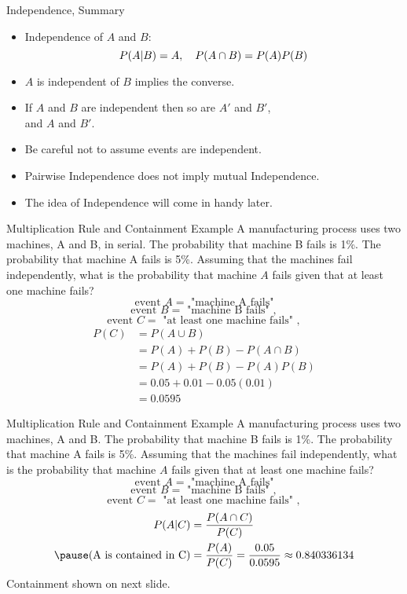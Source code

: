 \documentclass[handout]{beamer}
\begin{document}
\begin{frame}{Independence, Summary}
    \begin{itemize}
        \item Independence of $A$ and $B$:
        $$P(A|B) = A, \hskip 1em P(A \cap B) = P(A)P(B)$$
        \item $A$ is independent of $B$ implies the converse.
        \item If $A$ and $B$ are independent then so are $A'$ and $B'$,\\ and $A$ and $B'$.
        \item Be careful not to assume events are independent.
        \item Pairwise Independence does not imply mutual Independence.
        \item The idea of Independence will come in handy later.
    \end{itemize}
\end{frame}

\begin{frame}{Multiplication Rule and Containment Example}
    A manufacturing process uses two machines, A and B, in serial. The probability that machine B fails is 1\%. The probability that machine A fails is 5\%. Assuming that the machines fail independently, what is the probability that machine $A$ fails given that at least one machine fails?
    \pause $$\text{event } A = \text{ "machine A fails"}$$ 
    $$\text{event } B = \text{ "machine B fails" }, $$
    $$\text{event } C = \text{ "at least one machine fails" }, $$
    \pause 
    \begin{align*}
        P(C) &= P(A \cup B) \\
        &= P(A) + P(B) - P(A\cap B) \\
        &= P(A) + P(B) - P(A)P(B) \\
        & = 0.05 + 0.01 - 0.05(0.01) \\
        & = 0.0595
    \end{align*}
\end{frame}

\begin{frame}{Multiplication Rule and Containment Example}
    A manufacturing process uses two machines, A and B. The probability that machine B fails is 1\%. The probability that machine A fails is 5\%. Assuming that the machines fail independently, what is the probability that machine $A$ fails given that at least one machine fails?
    \pause $$\text{event } A = \text{ "machine A fails"}$$ 
    $$\text{event } B = \text{ "machine B fails" }, $$
    $$\text{event } C = \text{ "at least one machine fails" }, $$
    \pause 
    \begin{align*}
        P(A|C) &= \frac{P(A\cap C)}{P(C)} \\
        \pause (\text{A is contained in C}) &= \frac{P(A)}{P(C)} = \frac{0.05}{0.0595} \approx 0.840336134
    \end{align*}
    Containment shown on next slide.
\end{frame}
\end{document}
